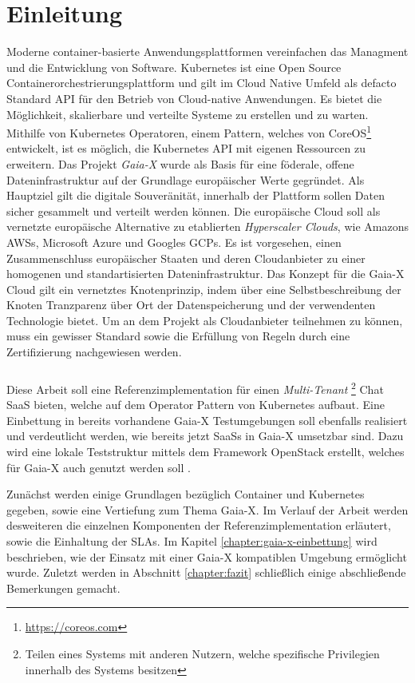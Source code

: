 \chapter{Einleitung}
\label{chap:einleitung}

Moderne container-basierte Anwendungsplattformen vereinfachen das Managment und die Entwicklung
von Software. Kubernetes \cite{kubernetes} ist eine Open Source Containerorchestrierungsplattform und gilt im
Cloud Native Umfeld als defacto Standard API für den Betrieb von Cloud-native Anwendungen.
Es bietet die Möglichkeit, skalierbare und verteilte Systeme zu erstellen und zu warten. \cite{Burns2019}
Mithilfe von Kubernetes Operatoren, einem Pattern, welches von CoreOS\footnote{\url{https://coreos.com}} entwickelt,
ist es möglich, die Kubernetes API mit eigenen Ressourcen zu erweitern.
Das Projekt \emph{Gaia-X} wurde als Basis für eine föderale, offene Dateninfrastruktur auf der Grundlage europäischer Werte gegründet.
Als Hauptziel gilt die digitale Souveränität, innerhalb der Plattform sollen Daten sicher gesammelt und verteilt werden können.
Die europäische Cloud soll als vernetzte europäische Alternative zu etablierten \emph{Hyperscaler Clouds}, wie Amazons \acp{AWS},
Microsoft Azure und Googles \acp{GCP}. Es ist vorgesehen, einen Zusammenschluss europäischer Staaten und deren
Cloudanbieter zu einer homogenen und standartisierten Dateninfrastruktur.
Das Konzept für die Gaia-X Cloud gilt ein vernetztes Knotenprinzip, indem über eine Selbstbeschreibung der Knoten
Tranzparenz über Ort der Datenspeicherung und der verwendenten Technologie bietet. Um an dem Projekt als Cloudanbieter
teilnehmen zu können, muss ein gewisser Standard sowie die Erfüllung von Regeln durch eine Zertifizierung nachgewiesen werden.\cite{BMWi2019}

\paragraph{}
Diese Arbeit soll eine Referenzimplementation für einen \emph{Multi-Tenant}
\footnote{Teilen eines Systems mit anderen Nutzern, welche spezifische Privilegien innerhalb des Systems besitzen}
Chat \ac{SaaS} bieten, welche auf dem Operator Pattern von Kubernetes aufbaut.
Eine Einbettung in bereits vorhandene Gaia-X Testumgebungen soll ebenfalls realisiert und verdeutlicht werden,
wie bereits jetzt \acp{SaaS} in Gaia-X umsetzbar sind. Dazu wird eine lokale Teststruktur mittels dem Framework OpenStack erstellt,
welches für Gaia-X auch genutzt werden soll \cite{scs}.

Zunächst werden einige Grundlagen bezüglich Container und Kubernetes gegeben, sowie eine Vertiefung zum Thema Gaia-X.
Im Verlauf der Arbeit werden desweiteren die einzelnen Komponenten der Referenzimplementation erläutert, sowie die Einhaltung der \acp{SLA}.
Im Kapitel \ref{chapter:gaia-x-einbettung} wird beschrieben, wie der Einsatz mit einer Gaia-X kompatiblen Umgebung ermöglicht wurde.
Zuletzt werden in Abschnitt \ref{chapter:fazit} schließlich einige abschließende Bemerkungen gemacht.